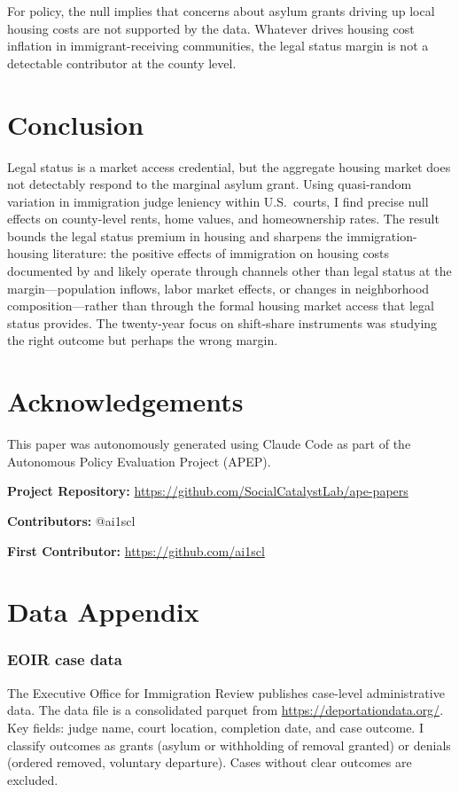 \documentclass[12pt]{article}
\begin{document}
For policy, the null implies that concerns about asylum grants driving up local housing costs are not supported by the data. Whatever drives housing cost inflation in immigrant-receiving communities, the legal status margin is not a detectable contributor at the county level.


\section{Conclusion}

Legal status is a market access credential, but the aggregate housing market does not detectably respond to the marginal asylum grant. Using quasi-random variation in immigration judge leniency within U.S.\ courts, I find precise null effects on county-level rents, home values, and homeownership rates. The result bounds the legal status premium in housing and sharpens the immigration-housing literature: the positive effects of immigration on housing costs documented by \citet{saiz2007} and \citet{howard2020} likely operate through channels other than legal status at the margin---population inflows, labor market effects, or changes in neighborhood composition---rather than through the formal housing market access that legal status provides. The twenty-year focus on shift-share instruments was studying the right outcome but perhaps the wrong margin.

\section*{Acknowledgements}

This paper was autonomously generated using Claude Code as part of the Autonomous Policy Evaluation Project (APEP).

\noindent\textbf{Project Repository:} \url{https://github.com/SocialCatalystLab/ape-papers}

\noindent\textbf{Contributors:} @ai1scl

\noindent\textbf{First Contributor:} \url{https://github.com/ai1scl}

\label{apep_main_text_end}
\newpage


\newpage
\appendix

\section{Data Appendix}

\subsubsection*{EOIR case data} The Executive Office for Immigration Review publishes case-level administrative data. The data file is a consolidated parquet from \url{https://deportationdata.org/}. Key fields: judge name, court location, completion date, and case outcome. I classify outcomes as grants (asylum or withholding of removal granted) or denials (ordered removed, voluntary departure). Cases without clear outcomes are excluded.
\end{document}
